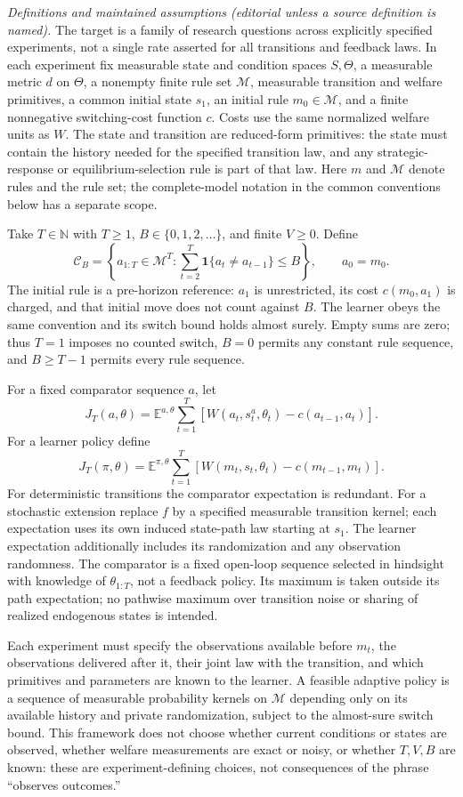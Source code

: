 \documentclass[11pt,a4paper]{article}
\newcommand{\N}{\mathbb N}
\newcommand{\ind}{\mathbf 1}
\begin{document}
\emph{Definitions and maintained assumptions (editorial unless a source definition is named).} The target is a family of research questions across explicitly specified experiments, not a single rate asserted for all transitions and feedback laws. In each experiment fix measurable state and condition spaces \(S,\Theta\), a measurable metric \(d\) on \(\Theta\), a nonempty finite rule set \(\mathcal M\), measurable transition and welfare primitives, a common initial state \(s_1\), an initial rule \(m_0\in\mathcal M\), and a finite nonnegative switching-cost function \(c\). Costs use the same normalized welfare units as \(W\). The state and transition are reduced-form primitives: the state must contain the history needed for the specified transition law, and any strategic-response or equilibrium-selection rule is part of that law. Here \(m\) and \(\mathcal M\) denote rules and the rule set; the complete-model notation in the common conventions below has a separate scope.

Take \(T\in\N\) with \(T\ge1\), \(B\in\{0,1,2,\ldots\}\), and finite \(V\ge0\). Define
\[
 \mathcal C_B=\left\{a_{1:T}\in\mathcal M^T:
 \sum_{t=2}^T\ind\{a_t\ne a_{t-1}\}\le B\right\},\qquad a_0=m_0.
\]
The initial rule is a pre-horizon reference: \(a_1\) is unrestricted, its cost \(c(m_0,a_1)\) is charged, and that initial move does not count against \(B\). The learner obeys the same convention and its switch bound holds almost surely. Empty sums are zero; thus \(T=1\) imposes no counted switch, \(B=0\) permits any constant rule sequence, and \(B\ge T-1\) permits every rule sequence.

For a fixed comparator sequence \(a\), let
\[
 J_T(a,\theta)=\mathbb E^{a,\theta}\sum_{t=1}^T
 [W(a_t,s_t^a,\theta_t)-c(a_{t-1},a_t)].
\]
For a learner policy define
\[
 J_T(\pi,\theta)=\mathbb E^{\pi,\theta}\sum_{t=1}^T
 [W(m_t,s_t,\theta_t)-c(m_{t-1},m_t)].
\]
For deterministic transitions the comparator expectation is redundant. For a stochastic extension replace \(f\) by a specified measurable transition kernel; each expectation uses its own induced state-path law starting at \(s_1\). The learner expectation additionally includes its randomization and any observation randomness. The comparator is a fixed open-loop sequence selected in hindsight with knowledge of \(\theta_{1:T}\), not a feedback policy. Its maximum is taken outside its path expectation; no pathwise maximum over transition noise or sharing of realized endogenous states is intended.

Each experiment must specify the observations available before \(m_t\), the observations delivered after it, their joint law with the transition, and which primitives and parameters are known to the learner. A feasible adaptive policy is a sequence of measurable probability kernels on \(\mathcal M\) depending only on its available history and private randomization, subject to the almost-sure switch bound. This framework does not choose whether current conditions or states are observed, whether welfare measurements are exact or noisy, or whether \(T,V,B\) are known: these are experiment-defining choices, not consequences of the phrase ``observes outcomes.''
\end{document}
